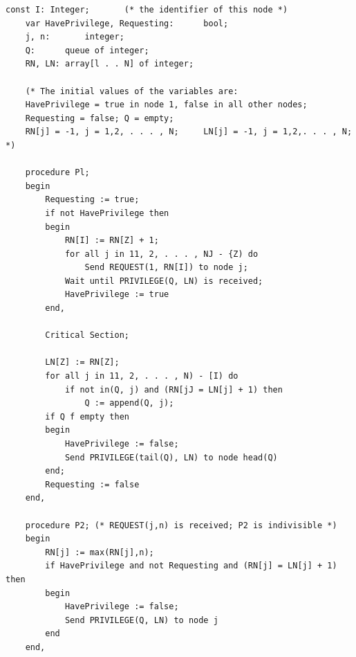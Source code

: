 \documentclass[a4paper,12pt]{article}
\begin{document}
\begin{lstlisting}[label=some-code,caption=Suzuki and Kazami's algorithm]
const I: Integer;		(* the identifier of this node *)
	var HavePrivilege, Requesting:		bool;
	j, n:	 	integer;
	Q: 		queue of integer;
	RN, LN:	array[l . . N] of integer;

	(* The initial values of the variables are:
	HavePrivilege = true in node 1, false in all other nodes;
	Requesting = false; Q = empty;
	RN[j] = -1, j = 1,2, . . . , N;  	LN[j] = -1, j = 1,2,. . . , N; *)

	procedure Pl;
	begin
		Requesting := true;
		if not HavePrivilege then
		begin
			RN[I] := RN[Z] + 1;
			for all j in 11, 2, . . . , NJ - {Z) do
				Send REQUEST(1, RN[I]) to node j;
			Wait until PRIVILEGE(Q, LN) is received;
			HavePrivilege := true
		end,
	
		Critical Section;

		LN[Z] := RN[Z];
		for all j in 11, 2, . . . , N) - [I) do
			if not in(Q, j) and (RN[jJ = LN[j] + 1) then
				Q := append(Q, j);
		if Q f empty then
		begin
			HavePrivilege := false;
			Send PRIVILEGE(tail(Q), LN) to node head(Q)
		end;
		Requesting := false
	end,

	procedure P2; (* REQUEST(j,n) is received; P2 is indivisible *)
	begin
		RN[j] := max(RN[j],n);
		if HavePrivilege and not Requesting and (RN[j] = LN[j] + 1) then
		begin
			HavePrivilege := false;
			Send PRIVILEGE(Q, LN) to node j
		end
	end,

\end{lstlisting}
\end{document}
